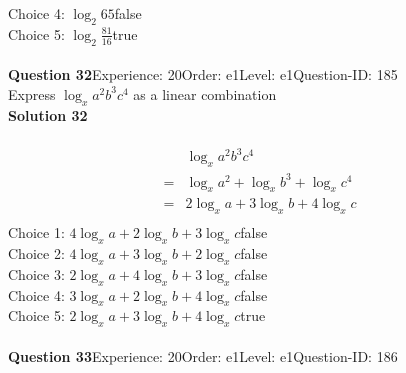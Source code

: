 \documentclass{article}
\begin{document}
Choice 4: \hspace{20pt}$\log_{2}65$\hspace{20pt}false\\
Choice 5: \hspace{20pt}$\log_{2}\displaystyle\frac{81}{16}$\hspace{20pt}true\\
\\[4pt]
\noindent\textbf{Question 32}\hspace{20pt}Experience: 20\hspace{20pt}Order: e1\hspace{20pt}Level: e1\hspace{20pt}Question-ID: 185\\[2pt]
Express $\log_{x}a^2b^3c^4$ as a linear combination\\[4pt]
\noindent\textbf{Solution 32}\\[2pt]
\\[-35pt]\begin{align*}
&\log_{x}a^2b^3c^4\\[2pt]
=&\log_{x}a^2+\log_{x}b^3+\log_{x}c^4\\[2pt]
=&2\log_{x}a+3\log_{x}b+4\log_{x}c\\[-30pt]
\end{align*}
Choice 1: \hspace{20pt}$4\log_{x}a+2\log_{x}b+3\log_{x}c$\hspace{20pt}false\\
Choice 2: \hspace{20pt}$4\log_{x}a+3\log_{x}b+2\log_{x}c$\hspace{20pt}false\\
Choice 3: \hspace{20pt}$2\log_{x}a+4\log_{x}b+3\log_{x}c$\hspace{20pt}false\\
Choice 4: \hspace{20pt}$3\log_{x}a+2\log_{x}b+4\log_{x}c$\hspace{20pt}false\\
Choice 5: \hspace{20pt}$2\log_{x}a+3\log_{x}b+4\log_{x}c$\hspace{20pt}true\\
\\[4pt]
\noindent\textbf{Question 33}\hspace{20pt}Experience: 20\hspace{20pt}Order: e1\hspace{20pt}Level: e1\hspace{20pt}Question-ID: 186\\[2pt]
\end{document}
